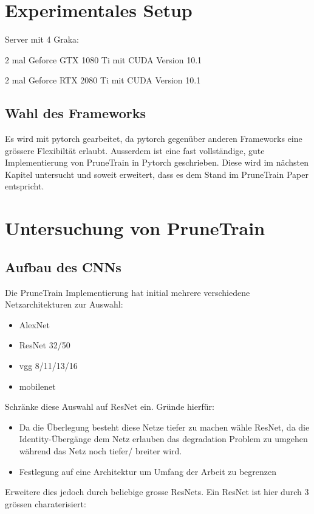 \section{Experimentales Setup}
Server mit 4 Graka:

2 mal Geforce GTX 1080 Ti mit CUDA Version 10.1 


2 mal Geforce RTX 2080 Ti mit CUDA Version 10.1

\subsection{Wahl des Frameworks}

Es wird mit pytorch gearbeitet, da pytorch gegenüber anderen Frameworks eine grössere Flexibiltät erlaubt. Ausserdem ist eine fast vollständige, gute Implementierung von PruneTrain in Pytorch geschrieben. Diese wird im nächsten Kapitel untersucht und soweit erweitert, dass es dem Stand im PruneTrain Paper entspricht.



\section{Untersuchung von PruneTrain}

\subsection{Aufbau des CNNs}
Die PruneTrain Implementierung hat initial mehrere verschiedene Netzarchitekturen zur Auswahl:
\begin{itemize}
 \item AlexNet
 \item ResNet 32/50
 \item vgg 8/11/13/16
 \item mobilenet
\end{itemize}

Schränke diese Auswahl auf ResNet ein.
Gründe hierfür:
\begin{itemize}
 \item Da die Überlegung besteht diese Netze tiefer zu machen wähle ResNet, da die Identity-Übergänge dem Netz erlauben das degradation Problem zu umgehen während das Netz noch tiefer/ breiter wird.
 \item Festlegung auf eine Architektur um Umfang der Arbeit zu begrenzen
\end{itemize}




Erweitere dies jedoch durch beliebige grosse ResNets. Ein ResNet ist hier durch 3 grössen charaterisiert:



